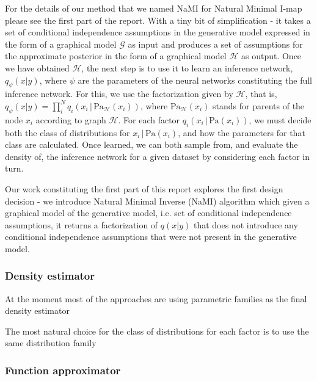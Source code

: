 \documentclass[12pt]{article}
\begin{document}
For the details of our method that we named NaMI for Natural Minimal I-map please see the first part of the report. 
With a tiny bit of simplification - it takes a set of conditional independence assumptions in the generative model expressed in the form of a graphical model $\mathcal{G}$ as input and produces a set of assumptions for the approximate posterior in the form of a graphical model $\mathcal{H}$ as output.
Once we have obtained $\mathcal{H}$, the next step is to use it to learn an inference network, $q_\psi(x|y)$, where $\psi$ are the parameters of the neural networks constituting the full inference network. 
For this, we use the factorization given by $\mathcal{H}$, that is, $q_\psi(x|y)=\prod^N_i q_i(x_i\,|\,\text{Pa}_\mathcal{H}(x_i))$, where $\text{Pa}_\mathcal{H}(x_i)$ stands for parents of the node $x_i$ according to graph $\mathcal{H}$.
For each factor $q_i(x_i\,|\,\text{Pa}(x_i))$, we must decide both the class of distributions for $x_i\,|\,\text{Pa}(x_i)$, and how the parameters for that class are calculated.
Once learned, we can both sample from, and evaluate the density of, the inference network for a given dataset by considering each factor in turn.

Our work constituting the first part of this report explores the first design decision -
we introduce Natural Minimal Inverse (NaMI) algorithm which given a graphical model of the generative model, 
i.e. set of conditional independence assumptions, it returns a factorization of $q(x|y)$ that
does not introduce any conditional independence assumptions that were not present in the
generative model.




\subsubsection*{Density estimator}
At the moment most of the approaches are using parametric families as the final density estimator 

The most natural choice for the class of distributions for each factor is to use the same distribution family


\subsubsection*{Function approximator}
\end{document}
